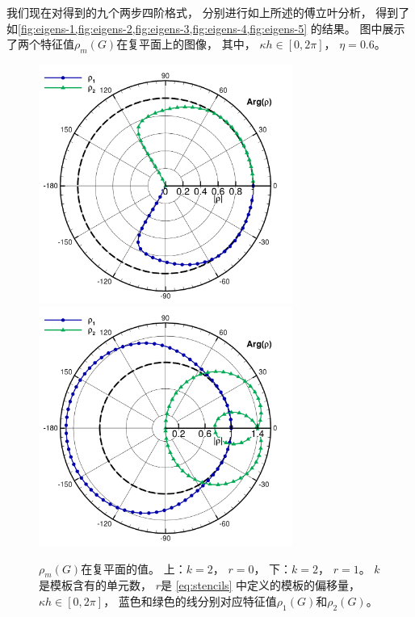 我们现在对得到的九个两步四阶格式，
分别进行如上所述的傅立叶分析，
得到了如\cref{fig:eigens-1,fig:eigens-2,fig:eigens-3,fig:eigens-4,fig:eigens-5} 的结果。
图中展示了两个特征值$\rho_m(G)$在复平面上的图像，
其中，
$\kappa h\in[0,2\pi]$，
$\eta = 0.6$。

\begin{figure}[htbp]
  \centering
  \includegraphics[width=0.74\textwidth]{fig/1D/pol40.pdf}
  \includegraphics[width=0.74\textwidth]{fig/1D/pol41.pdf}
  \caption{$\rho_m(G)$在复平面的值。
    上：$k=2$，
    $r=0$，
    下：$k=2$，
    $r=1$。
    $k$是模板含有的单元数，
    $r$是 \cref{eq:stencils} 中定义的模板的偏移量，
    $\kappa h\in [0,2\pi]$，
    蓝色和绿色的线分别对应特征值$\rho_1(G)$和$\rho_2(G)$。
  }
  \label{fig:eigens-1}
\end{figure}

